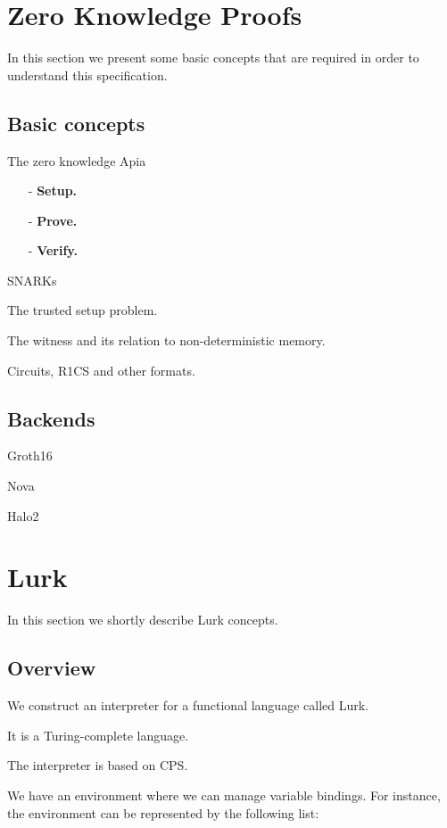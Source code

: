 \documentclass[10pt, english]{article}
\begin{document}
\section{Zero Knowledge Proofs}

In this section we present some basic concepts that are required in order to understand this specification.

\subsection{Basic concepts}

The zero knowledge Apia

\begin{itemize}
		\item[-] \textbf{Setup.}
		\item[-] \textbf{Prove.}
		\item[-] \textbf{Verify.}
\end{itemize}

SNARKs

The trusted setup problem.

The witness and its relation to non-deterministic memory.

Circuits, R1CS and other formats.

\subsection{Backends}

Groth16~\cite{groth16}

Nova~\cite{nova}

Halo2~\cite{halo, halo2}


\section{Lurk}

In this section we shortly describe Lurk concepts.

\subsection{Overview}

We construct an interpreter for a functional language called Lurk.

It is a Turing-complete language.

The interpreter is based on CPS.

We have an environment where we can manage variable bindings. For instance, the environment can be represented by the following list:
\end{document}
